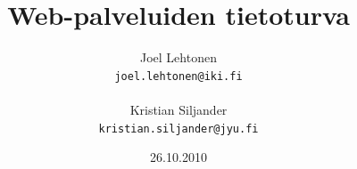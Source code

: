 \documentclass[a4paper,12pt]{article}
\title{Web-palveluiden tietoturva}
\author{Joel Lehtonen\\ \texttt{joel.lehtonen@iki.fi} \\\\Kristian Siljander\\ \texttt{kristian.siljander@jyu.fi}}
\date{26.10.2010}
\begin{document}
\maketitle



\pagebreak



\end{document}
